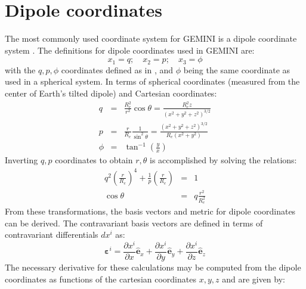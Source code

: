 \documentclass[11pt,letterpaper]{article}
\begin{document}
\section{Dipole coordinates}

The most commonly used coordinate system for GEMINI is a dipole coordinate system \citep{Huba:2000}.  The definitions for dipole coordinates used in GEMINI are:  
\begin{equation}
x_1 = q; \quad x_2 = p; \quad x_3 = \phi
\end{equation}
with the $q,p,\phi$ coordinates defined as in \citet{Huba:2000}, and $\phi$ being the same coordinate as used in a spherical system.  In terms of spherical coordinates (measured from the center of Earth's tilted dipole) and Cartesian coordinates:  
\begin{eqnarray}
q &=& \frac{R_e^2}{r^2} \cos \theta = \frac{R_e^2 z}{\left( x^2+y^2+z^2\right)^{3/2}}\\
p &=& \frac{r}{R_e} \frac{1}{\sin^2 \theta} = \frac{\left( x^2+y^2+z^2\right)^{3/2}}{R_e \left( x^2 + y^2 \right) } \\
\phi &=& \tan^{-1} \left( \frac{y}{x} \right)
\end{eqnarray}
Inverting $q,p$ coordinates to obtain $r,\theta$ is accomplished by solving the relations:
\begin{eqnarray}
q^2 \left( \frac{r}{R_e}\right)^4 + \frac{1}{p} \left( \frac{r}{R_e}\right)  &=& 1 \\
\cos \theta &=& q \frac{r^2}{R_e^2}
\end{eqnarray}
From these transformations, the basis vectors and metric for dipole coordinates can be derived.  The contravariant basis vectors are defined in terms of contravariant differentials $d x^i$ as:
\begin{equation}
\boldsymbol{\varepsilon}^i = \frac{\partial x^i}{\partial x} \hat{\mathbf{e}}_x + \frac{\partial x^i}{\partial y} \hat{\mathbf{e}}_y + \frac{\partial x^i}{\partial z} \hat{\mathbf{e}}_z
\end{equation}
The necessary derivative for these calculations may be computed from the dipole coordinates as functions of the cartesian coordinates $x,y,z$ and are given by:  
\end{document}
